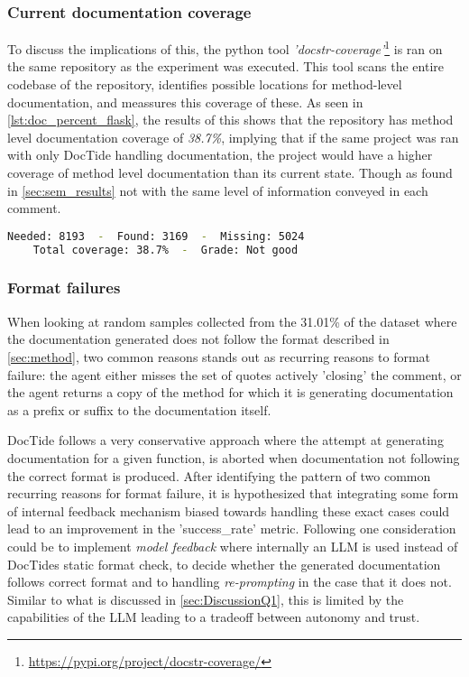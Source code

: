 \subsubsection*{Current documentation coverage}
To discuss the implications of this, the python tool \textit{'docstr-coverage'}\footnote{\url{https://pypi.org/project/docstr-coverage/}} is ran on the same repository as the experiment was executed. This tool scans the entire codebase of the repository, identifies possible locations for method-level documentation, and meassures this coverage of these. As seen in \cref{lst:doc_percent_flask}, the results of this shows that the repository has method level documentation coverage of \textit{38.7\%}, implying that if the same project was ran with only DocTide handling documentation, the project would have a higher coverage of method level documentation than its current state. Though as found in \cref{sec:sem_results} not with the same level of information conveyed in each comment.

\begin{lstlisting}[language=sh, label={lst:doc_percent_flask},      caption= Ratio of method level documentation in flask repository]
    Needed: 8193  -  Found: 3169  -  Missing: 5024
    Total coverage: 38.7%  -  Grade: Not good
\end{lstlisting}

\subsubsection*{Format failures}
When looking at random samples collected from the 31.01\% of the dataset where the documentation generated does not follow the format described in \cref{sec:method}, two common reasons stands out as recurring reasons to format failure: the agent either misses the set of quotes actively 'closing' the comment, or the agent returns a copy of the method for which it is generating documentation as a prefix or suffix to the documentation itself. 

DocTide follows a very conservative approach where the attempt at generating documentation for a given function, is aborted when documentation not following the correct format is produced. After identifying the pattern of two common recurring reasons for format failure, it is hypothesized that integrating some form of internal feedback mechanism biased towards handling these exact cases could lead to an improvement in the 'success\_rate' metric. Following \cite{wang2024survey} one consideration could be to implement \textit{model feedback} where internally an LLM is used instead of DocTides static format check, to decide whether the generated documentation follows correct format and to handling \textit{re-prompting} in the case that it does not. Similar to what is discussed in \cref{sec:DiscussionQ1}, this is limited by the capabilities of the LLM leading to a tradeoff between autonomy and trust.

